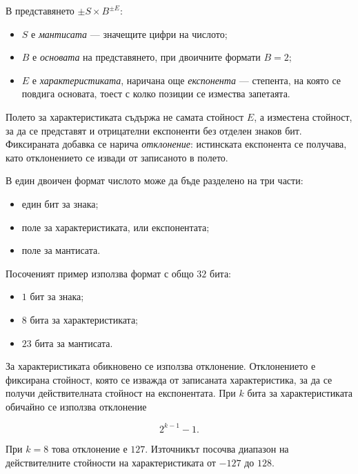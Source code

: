 \begin{defn}
В представянето $\pm S\times B^{\pm E}$:

\begin{itemize}
\item $S$ е \emph{мантисата} --- значещите цифри на числото;
\item $B$ е \emph{основата} на представянето, при двоичните формати $B=2$;
\item $E$ е \emph{характеристиката}, наричана още \emph{експонента} --- степента, на която се повдига основата, тоест с колко позиции се измества запетаята.
\end{itemize}

Полето за характеристиката съдържа не самата стойност $E$, а изместена стойност, за да се представят и отрицателни експоненти без отделен знаков бит. Фиксираната добавка се нарича \emph{отклонение}: истинската експонента се получава, като отклонението се извади от записаното в полето.
\end{defn}

В един двоичен формат числото може да бъде разделено на три части:

\begin{itemize}
    \item един бит за знака;
    \item поле за характеристиката, или експонентата;
    \item поле за мантисата.
\end{itemize}

Посоченият пример използва формат с общо $32$ бита:

\begin{itemize}
    \item $1$ бит за знака;
    \item $8$ бита за характеристиката;
    \item $23$ бита за мантисата.
\end{itemize}

За характеристиката обикновено се използва отклонение. Отклонението е фиксирана стойност, която се изважда от записаната характеристика, за да се получи действителната стойност на експонентата. При $k$ бита за характеристиката обичайно се използва отклонение

\[
2^{k-1}-1.
\]

При $k=8$ това отклонение е $127$. Източникът посочва диапазон на действителните стойности на характеристиката от $-127$ до $128$.


